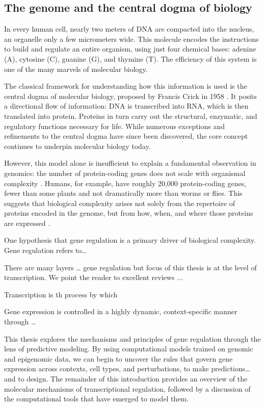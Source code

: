 \begin{dissertationintroduction}

    \section{The genome and the central dogma of biology}

    In every human cell, nearly two meters of DNA are compacted into the nucleus, an organelle only a few micrometers wide. This molecule encodes the instructions to build and regulate an entire organism, using just four chemical bases: adenine (A), cytosine (C), guanine (G), and thymine (T). The efficiency of this system is one of the many marvels of molecular biology.

    The classical framework for understanding how this information is used is the central dogma of molecular biology, proposed by Francis Crick in 1958 {}. It posits a directional flow of information: DNA is transcribed into RNA, which is then translated into protein. Proteins in turn carry out the structural, enzymatic, and regulatory functions necessary for life. While numerous exceptions and refinements to the central dogma have since been discovered, the core concept continues to underpin molecular biology today.

    However, this model alone is insufficient to explain a fundamental observation in genomics: the number of protein-coding genes does not scale with organismal complexity {}. Humans, for example, have roughly 20,000 protein-coding genes, fewer than some plants and not dramatically more than worms or flies. This suggests that biological complexity arises not solely from the repertoire of proteins encoded in the genome, but from how, when, and where those proteins are expressed {}.

    One hypothesis that gene regulation is a primary driver of biological complexity. Gene regulation refers to…

    There are many layers … gene regulation but focus of this thesis is at the level of transcription. We point the reader to excellent reviews {}...

    Transcription is th process by which

    Gene expression is controlled in a highly dynamic, context-specific manner through …

    This thesis explores the mechanisms and principles of gene regulation through the lens of predictive modeling. By using computational models trained on genomic and epigenomic data, we can begin to uncover the rules that govern gene expression across contexts, cell types, and perturbations, to make predictions… and to design. The remainder of this introduction provides an overview of the molecular mechanisms of transcriptional regulation, followed by a discussion of the computational tools that have emerged to model them.


\end{dissertationintroduction}
